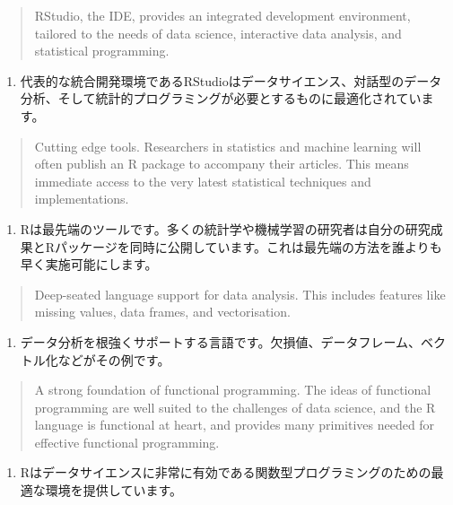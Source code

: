 \documentclass[
  a4paper,
  pandoc,
  ja=standard,
  jafont=haranoaji]{bxjsbook}
\providecommand{\tightlist}{%
  \setlength{\itemsep}{0pt}\setlength{\parskip}{0pt}}
\begin{document}
\begin{quote}
RStudio, the IDE, provides an integrated development environment,
tailored to the needs of data science, interactive data analysis, and
statistical programming.
\end{quote}

\begin{enumerate}
\def\labelenumi{\arabic{enumi}.}
\setcounter{enumi}{4}
\tightlist
\item
  代表的な統合開発環境であるRStudioはデータサイエンス、対話型のデータ分析、そして統計的プログラミングが必要とするものに最適化されています。
\end{enumerate}

\begin{quote}
Cutting edge tools. Researchers in statistics and machine learning will
often publish an R package to accompany their articles. This means
immediate access to the very latest statistical techniques and
implementations.
\end{quote}

\begin{enumerate}
\def\labelenumi{\arabic{enumi}.}
\setcounter{enumi}{5}
\tightlist
\item
  Rは最先端のツールです。多くの統計学や機械学習の研究者は自分の研究成果とRパッケージを同時に公開しています。これは最先端の方法を誰よりも早く実施可能にします。
\end{enumerate}

\begin{quote}
Deep-seated language support for data analysis. This includes features
like missing values, data frames, and vectorisation.
\end{quote}

\begin{enumerate}
\def\labelenumi{\arabic{enumi}.}
\setcounter{enumi}{6}
\tightlist
\item
  データ分析を根強くサポートする言語です。欠損値、データフレーム、ベクトル化などがその例です。
\end{enumerate}

\begin{quote}
A strong foundation of functional programming. The ideas of functional
programming are well suited to the challenges of data science, and the R
language is functional at heart, and provides many primitives needed for
effective functional programming.
\end{quote}

\begin{enumerate}
\def\labelenumi{\arabic{enumi}.}
\setcounter{enumi}{7}
\tightlist
\item
  Rはデータサイエンスに非常に有効である関数型プログラミングのための最適な環境を提供しています。
\end{enumerate}
\end{document}
